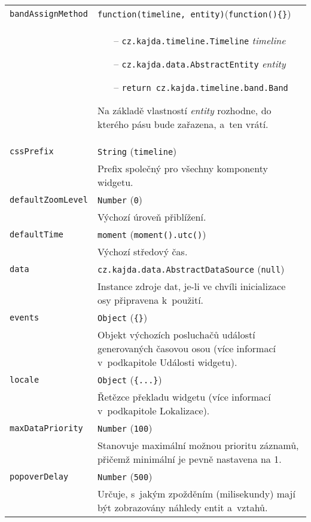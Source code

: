 {\begin{longtable}{|p{}p{}|}
		\hline
		{\tt bandAssignMethod} & {\tt function(timeline, entity)}\hfill({\tt function()\{\}})\\[-7mm]
		& \begin{itemize}
		\item[--] {\tt cz.kajda.timeline.Timeline} {\it timeline}
		\item[--] {\tt cz.kajda.data.AbstractEntity} {\it entity}
		\item[--] {\tt return cz.kajda.timeline.band.Band}
		\end{itemize}
		Na základě vlastností {\it entity} rozhodne, do kterého pásu bude zařazena, a~ten vrátí.\\
		
		\hline
		{\tt cssPrefix} & {\tt String} \hfill ({\tt timeline})\\
		& Prefix společný pro všechny komponenty widgetu.\\
		
		\hline
		{\tt defaultZoomLevel} & {\tt Number} \hfill ({\tt 0})\\
		& Výchozí úroveň přiblížení. \\
		
		\hline
		{\tt defaultTime} & {\tt moment} \hfill ({\tt moment().utc()})\\
		& Výchozí středový čas. \\
		
		\hline
		{\tt data} & {\tt cz.kajda.data.AbstractDataSource} \hfill ({\tt null})\\
		& Instance zdroje dat, je-li ve chvíli inicializace osy připravena k~použití. \\
		
		\hline
		{\tt events} & {\tt Object} \hfill ({\tt \{\}})\\
		& Objekt výchozích posluchačů událostí generovaných časovou osou (více informací v~podkapitole Události widgetu). \\
		
		\hline
		{\tt locale} & {\tt Object} \hfill ({\tt \{...\}})\\
		& Řetězce překladu widgetu (více informací v~podkapitole Lokalizace). \\
		
		\hline
		{\tt maxDataPriority} & {\tt Number} \hfill ({\tt 100})\\
		& Stanovuje maximální možnou prioritu záznamů, přičemž minimální je pevně nastavena na 1. \\
		
		\hline
		{\tt popoverDelay} & {\tt Number} \hfill ({\tt 500})\\
		& Určuje, s~jakým zpožděním (milisekundy) mají být zobrazovány náhledy entit a~vztahů.\\
		

\end{longtable}}
